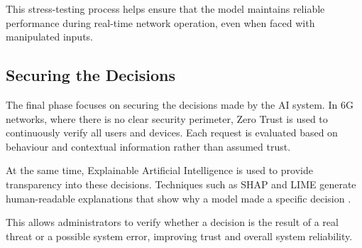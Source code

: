 \documentclass[letterpaper]{article} %
\begin{document}
This stress-testing process helps ensure that the model maintains reliable performance during real-time network operation, even when faced with manipulated inputs.

\subsection {Securing the Decisions}

The final phase focuses on securing the decisions made by the AI system. In 6G networks, where there is no clear security perimeter, Zero Trust is used to continuously verify all users and devices. Each request is evaluated based on behaviour and contextual information rather than assumed trust.

At the same time, Explainable Artificial Intelligence is used to provide transparency into these decisions. Techniques such as SHAP and LIME generate human-readable explanations that show why a model made a specific decision \cite{Kumar_Dutta_Vamsi_Sankararao_Varri_Puthal_2026}.

This allows administrators to verify whether a decision is the result of a real threat or a possible system error, improving trust and overall system reliability.


\end{document}
